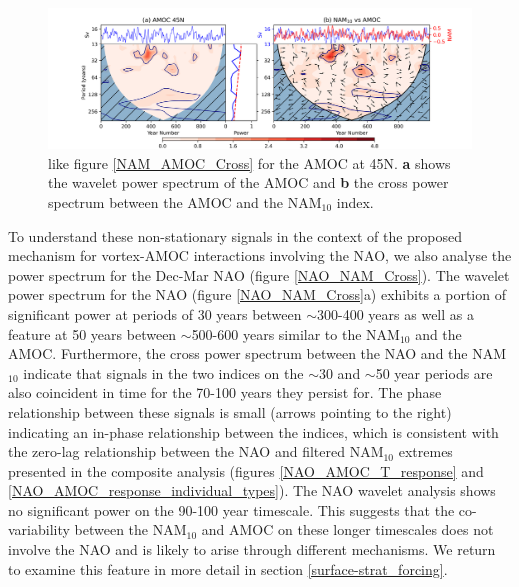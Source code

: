 \begin{center}
\begin{figure}[h!]
\noindent\includegraphics[width = \linewidth]{Figures/Figures-surface/AMOC_NAM_filtered_subplot_45N.png}
\caption{like figure \ref{NAM_AMOC_Cross} for the AMOC at 45N. \textbf{a} shows the wavelet power spectrum of the AMOC and \textbf{b} the cross power spectrum between the AMOC and the NAM$_{10}$ index.}
\label{NAM_AMOC_Cross_45}
\end{figure}
\end{center}
  
To understand these non-stationary signals in the context of the proposed mechanism for vortex-AMOC interactions involving the NAO, we also analyse the power spectrum for the Dec-Mar NAO (figure \ref{NAO_NAM_Cross}). The wavelet power spectrum for the NAO (figure \ref{NAO_NAM_Cross}a) exhibits a portion of significant power at periods of 30 years between $\sim$300-400 years as well as a feature at 50 years between $\sim$500-600 years similar to the NAM$_{10}$ and the AMOC. Furthermore, the cross power spectrum between the NAO and the NAM$_{10}$ indicate that signals in the two indices on the $\sim$30 and $\sim$50 year periods are also coincident in time for the 70-100 years they persist for. The phase relationship between these signals is small (arrows pointing to the right) indicating an in-phase relationship between the indices, which is consistent with the zero-lag relationship between the NAO and filtered NAM$_{10}$ extremes presented in the composite analysis (figures \ref{NAO_AMOC_T_response} and \ref{NAO_AMOC_response_individual_types}). The NAO wavelet analysis shows no significant power on the 90-100 year timescale. This suggests that the co-variability between the NAM$_{10}$ and AMOC on these longer timescales does not involve the NAO and is likely to arise through different mechanisms. We return to examine this feature in more detail in section \ref{surface-strat_forcing}.

